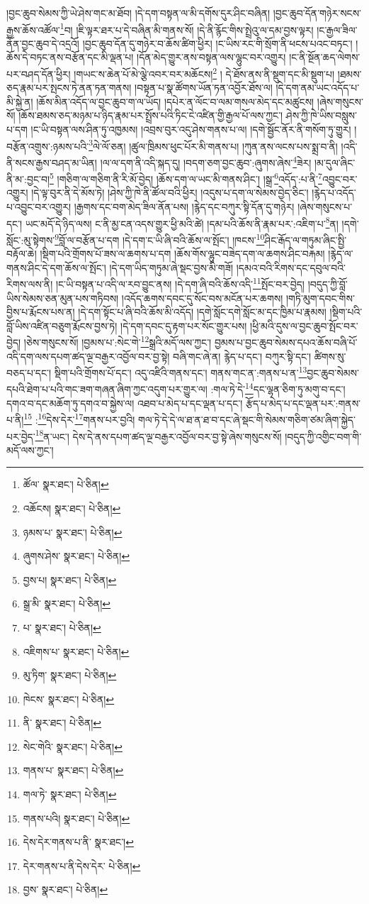 །བྱང་ཆུབ་སེམས་ཀྱི་ཡེ་ཤེས་གང་མ་ཐོབ། །དེ་དག་བསྟན་ལ་མི་དགོས་དུར་ཤིང་བཞིན། །བྱང་ཆུབ་དོན་གཉེར་སངས་རྒྱས་ཆོས་འཚོལ་\footnote{ཚོལ་  སྣར་ཐང་།  པེ་ཅིན། }བ། །ཇི་ལྟར་ཐར་པ་དེ་བཞིན་མི་གནས་སོ། །དེ་ནི་རྙོང་གིས་སྤྲེའུ་ལ་དམ་བྱས་ལྟར། །ང་རྒྱལ་ཟིལ་ནོན་བྱང་ཆུབ་དེ་འདྲའོ། །བྱང་ཆུབ་དོན་དུ་གཉེར་བ་ཆོས་ཚིག་ཕྱིར། །ང་ཡིས་རང་གི་སྲོག་ནི་ཕངས་པའང་བཏང་། །ཆོས་དེ་བཏང་ནས་བརྩོན་དང་མི་ལྡན་པ། །དོན་མེད་གྱུར་ནས་བསྟན་ལས་ལྷུང་བར་འགྱུར། །ང་ནི་སྔོན་ཆད་ལེགས་པར་བཤད་དོན་ཕྱིར། །གཡང་ས་ཆེན་པོ་མེ་ལྕེ་འབར་བར་མཆོངས།\footnote{འཆོངས།  སྣར་ཐང་།  པེ་ཅིན། } །
དེ་ཐོས་ནས་ནི་སྡུག་དང་མི་སྡུག་པ། །ཐམས་ཅད་རྣམ་པར་སྤངས་ཏེ་ནན་ཏན་གནས། །བསྟན་པ་སྣ་ཚོགས་ཡོན་ཏན་འབྱོར་ཐོས་ལ། །དེ་དག་ནམ་ཡང་འདོད་པ་མི་སྐྱེ་ན། །ཆོས་མིན་འདོད་ལ་བྱང་ཆུབ་ག་ལ་ཡོད། །དཔེར་ན་ལོང་བ་ལམ་གསལ་མེད་དང་མཚུངས། །ཞེས་གསུངས་སོ། །ཆོས་ཐམས་ཅད་མཉམ་པ་ཉིད་རྣམ་པར་སྤྲོས་པའི་ཏིང་ངེ་འཛིན་གྱི་རྒྱལ་པོ་ལས་ཀྱང་། ཤེས་ཀྱི་ཁེ་ཡིས་བསླུས་པ་དག །ང་ཡི་བསྟན་ལས་ཤིན་ཏུ་འཁྱམས། །འབྲས་བུར་འདུ་ཤེས་གནས་པ་ལ། །དགེ་སྦྱོང་ནོར་ནི་གསོག་ཏུ་གྱུར། །བརྩོན་འགྲུས་:ཉམས་པའི་\footnote{ཉམས་པ་  སྣར་ཐང་།  པེ་ཅིན། }ལེ་ལོ་ཅན། །ཚུལ་ཁྲིམས་ཕུང་པོར་མི་གནས་པ། །ཀུན་ནས་ལངས་པས་སྨྲ་བ་ནི། །འདི་ནི་སངས་རྒྱས་བཤད་མ་ཡིན། །ལ་ལ་དག་ནི་འདི་སྐད་དུ། །བདག་ཅག་བྱང་ཆུབ་:ཞུགས་ཞེས་\footnote{ཞུགས་ཤེས་  སྣར་ཐང་།  པེ་ཅིན། }ཟེར། །མ་དུལ་ཞིང་ནི་མ་:བྱང་བ།\footnote{བྱས་པ།  སྣར་ཐང་།  པེ་ཅིན། } །གཅིག་ལ་གཅིག་ནི་རི་མོ་བྱེད། །ཆོས་དག་ལ་ཡང་མི་གནས་ཤིང་། །སྒྲ་\footnote{སྒྲ་མི་  སྣར་ཐང་།  པེ་ཅིན། }འདོད་:པ་ནི་\footnote{པ་  སྣར་ཐང་།  པེ་ཅིན། }འབྱུང་བར་འགྱུར། །དེ་ལྟ་བུར་ནི་དེ་མོས་ཏེ། །ཤེས་ཀྱི་ཁེ་ནི་ཚོལ་བའི་ཕྱིར། །འདུས་པ་དག་ལ་སེམས་བྱེད་ཅིང་། །རྙེད་པ་འདོད་པ་འབྱུང་བར་འགྱུར། །རྒྱགས་དང་བག་མེད་ཟིལ་ནོན་པས། །རྙེད་དང་བཀུར་སྟི་དོན་དུ་གཉེར། །ཞེས་གསུངས་པ་དང་། ཡང་མདོ་དེ་ཉིད་ལས། ང་ནི་མྱ་ངན་འདས་གྱུར་ཕྱི་མའི་ཚེ། །དམ་པའི་ཆོས་ནི་རྣམ་པར་:འཇིག་པ་\footnote{འཇིགས་པ་  སྣར་ཐང་།  པེ་ཅིན། }ན། །དགེ་སློང་:མུ་སྟེགས་\footnote{མུ་ཏིག་  སྣར་ཐང་།  པེ་ཅིན། }བློ་ལ་བརྩོན་པ་དག །དེ་དག་ང་ཡི་ཞི་བའི་ཆོས་ལ་སྤོང་། །ཁངས་\footnote{ཁེངས་  སྣར་ཐང་།  པེ་ཅིན། }ཤིང་རྒོད་ལ་གཏུམ་ཞིང་སྤྱི་བརྟོལ་ཆེ། །སྡིག་པའི་གྲོགས་པོ་ཟས་ལ་ཆགས་པ་དག །ཆོས་གོས་ལྷུང་བཟེད་དག་ལ་ཆགས་ཤིང་བརྐམ། །རྙེད་ལ་གནས་ཤིང་དེ་དག་ཆོས་ལ་སྤོང་། །དེ་དག་ཡིད་གཏུམ་ཞེ་སྡང་བྱས་མི་གཟོ། །དམའ་བའི་རིགས་དང་དབུལ་བའི་རིགས་ལས་ནི། །ང་ཡི་བསྟན་པ་འདི་ལ་རབ་བྱུང་ནས། །དེ་དག་ཞི་བའི་ཆོས་འདི་\footnote{ནི་  སྣར་ཐང་།  པེ་ཅིན། }སྤོང་བར་བྱེད། །བདུད་ཀྱི་བློ་ཡིས་སེམས་ཅན་མུན་པས་གཏིབས། །འདོད་ཆགས་དབང་དུ་སོང་བས་མངོན་པར་ཆགས། །གཏི་མུག་དབང་གིས་བྱིས་པ་རྨོངས་པས་ན། །དེ་དག་སྟོང་པ་ཞི་བའི་ཆོས་མི་འདོད། །དགེ་སློང་དགེ་སློང་མ་དང་ཁྱིམ་པ་རྣམས། །སྡིག་པའི་བློ་ཡིས་འཛིན་བཅུག་རྨོངས་བྱས་ཏེ། །དེ་དག་དབང་དུ་རྟག་པར་སོང་གྱུར་པས། །ཕྱི་མའི་དུས་ལ་བྱང་ཆུབ་སྤོང་བར་བྱེད། །ཅེས་གསུངས་སོ། །བྱམས་པ་:སེང་གེ་\footnote{སེང་གེའི་  སྣར་ཐང་།  པེ་ཅིན། }སྒྲའི་མདོ་ལས་ཀྱང་། བྱམས་པ་བྱང་ཆུབ་སེམས་དཔའ་ཆོས་བཞི་པོ་འདི་དག་ལས་དཔག་ཚད་ལྔ་བརྒྱར་འབྱོལ་བར་བྱ་སྟེ། བཞི་གང་ཞེ་ན། རྙེད་པ་དང་། བཀུར་སྟི་དང་། ཚིགས་སུ་བཅད་པ་དང་། སྡིག་པའི་གྲོགས་པོ་དང་། འདུ་འཛིའི་གནས་དང་། གནས་གང་ན་:གནས་པ་ན་\footnote{གནས་པ་  སྣར་ཐང་།  པེ་ཅིན། }བྱང་ཆུབ་སེམས་དཔའི་ཐེག་པ་པའི་གང་ཟག་གཞན་ཞིག་ཀྱང་འདུག་པར་གྱུར་ལ། :གལ་ཏེ་དེ་\footnote{གལ་ཏེ་  སྣར་ཐང་།  པེ་ཅིན། }དང་ལྷན་ཅིག་ཏུ་མགུ་བ་དང་། དགའ་བ་དང་མཆོག་ཏུ་དགའ་བ་སྐྱེས་ལ། འཐབ་པ་མེད་པ་དང་ལྡན་པ་དང་། རྩོད་པ་མེད་པ་དང་ལྡན་པར་:གནས་པ་ནི།\footnote{གནས་པའི།  སྣར་ཐང་།  པེ་ཅིན། } :\footnote{དེས་དེར་གནས་པ་ནི་  སྣར་ཐང་། }དེས་དེར་\footnote{དེར་གནས་པ་ནི་དེས་དེར་  པེ་ཅིན། }གནས་པར་བྱའི། གལ་ཏེ་དེ་དེ་ལ་ཐ་ན་ཐ་བ་དང་ཞེ་སྡང་གི་སེམས་གཅིག་ཙམ་ཞིག་སྐྱེད་པར་བྱེད་\footnote{བྱས་  སྣར་ཐང་།  པེ་ཅིན། }ན་ཡང་། དེས་དེ་ནས་དཔག་ཚད་ལྔ་བརྒྱར་འབྱོལ་བར་བྱ་སྟེ་ཞེས་གསུངས་སོ། །བདུད་ཀྱི་འགྱིང་བག་གི་མདོ་ལས་ཀྱང་། 